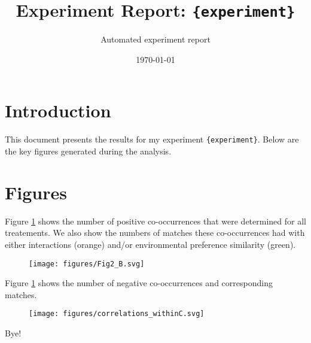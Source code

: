 \documentclass{article}
\begin{document}
\title{Experiment Report: \texttt{\{experiment\}}}
\author{Automated experiment report}
\date{\today}

\maketitle

\section{Introduction}
This document presents the results for my experiment \texttt{\{experiment\}}. Below are the key figures generated during the analysis.

\section{Figures}
Figure \ref{fig:Fig2_B} shows the number of positive co-occurrences that were determined for all treatements. We also show the numbers of matches these co-occurrences had with either interactions (orange) and/or environmental preference similarity (green). 

\begin{figure}[h!]
\centering
  \texttt{[image: figures/Fig2\_B.svg]}
  \caption{}
  \label{fig:Fig2_B}
\end{figure}

Figure \ref{fig:Fig2_B} shows the number of negative co-occurrences and corresponding matches.

\begin{figure}[h!]
\centering
  \texttt{[image: figures/correlations\_withinC.svg]}
  \caption{}
  \label{fig:correlations_withinC}
\end{figure}

Bye!
\end{document}
